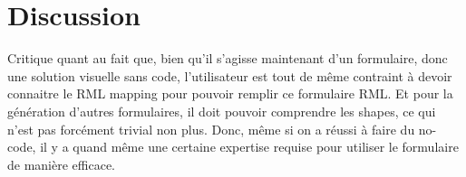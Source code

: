
\chapter{Discussion}
\label{chap:discussion}


Critique quant au fait que, bien qu'il s'agisse maintenant d'un formulaire, donc une solution visuelle sans code, l'utilisateur est tout de même contraint à devoir connaitre le RML mapping pour pouvoir remplir ce formulaire RML. Et pour la génération d'autres formulaires, il doit pouvoir comprendre les shapes, ce qui n'est pas forcément trivial non plus. Donc, même si on a réussi à faire du no-code, il y a quand même une certaine expertise requise pour utiliser le formulaire de manière efficace.